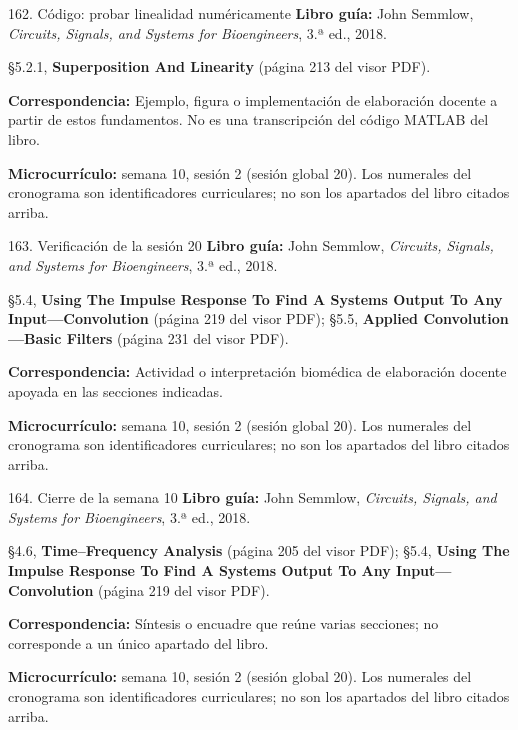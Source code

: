 \documentclass[
  10pt,
  ignorenonframetext,
  aspectratio=169,
  spanish,
]{beamer}
\begin{document}
\begin{frame}{162. Código: probar linealidad numéricamente}
\label{cuxf3digo-probar-linealidad-numuxe9ricamente}
\textbf{Libro guía:} John Semmlow, \emph{Circuits, Signals, and Systems
for Bioengineers}, 3.ª ed., 2018.

§5.2.1, \textbf{Superposition And Linearity} (página 213 del visor PDF).

\textbf{Correspondencia:} Ejemplo, figura o implementación de
elaboración docente a partir de estos fundamentos. No es una
transcripción del código MATLAB del libro.

\textbf{Microcurrículo:} semana 10, sesión 2 (sesión global 20). Los
numerales del cronograma son identificadores curriculares; no son los
apartados del libro citados arriba.
\end{frame}

\begin{frame}{163. Verificación de la sesión 20}
\label{verificaciuxf3n-de-la-sesiuxf3n-20}
\textbf{Libro guía:} John Semmlow, \emph{Circuits, Signals, and Systems
for Bioengineers}, 3.ª ed., 2018.

§5.4, \textbf{Using The Impulse Response To Find A Systems Output To Any
Input---Convolution} (página 219 del visor PDF); §5.5, \textbf{Applied
Convolution---Basic Filters} (página 231 del visor PDF).

\textbf{Correspondencia:} Actividad o interpretación biomédica de
elaboración docente apoyada en las secciones indicadas.

\textbf{Microcurrículo:} semana 10, sesión 2 (sesión global 20). Los
numerales del cronograma son identificadores curriculares; no son los
apartados del libro citados arriba.
\end{frame}

\begin{frame}{164. Cierre de la semana 10}
\label{cierre-de-la-semana-10}
\textbf{Libro guía:} John Semmlow, \emph{Circuits, Signals, and Systems
for Bioengineers}, 3.ª ed., 2018.

§4.6, \textbf{Time--Frequency Analysis} (página 205 del visor PDF);
§5.4, \textbf{Using The Impulse Response To Find A Systems Output To Any
Input---Convolution} (página 219 del visor PDF).

\textbf{Correspondencia:} Síntesis o encuadre que reúne varias
secciones; no corresponde a un único apartado del libro.

\textbf{Microcurrículo:} semana 10, sesión 2 (sesión global 20). Los
numerales del cronograma son identificadores curriculares; no son los
apartados del libro citados arriba.
\end{frame}
\end{document}
